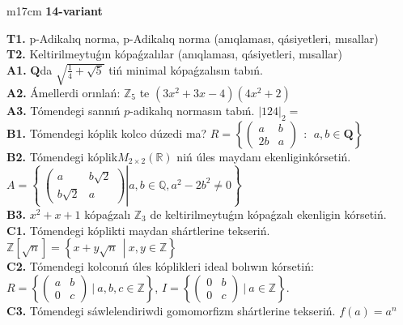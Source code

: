 \documentclass{article}
\begin{document}
\begin{tabular}{m{17cm}}
\textbf{14-variant}
\newline

\textbf{T1.} p-Adikalıq norma, p-Adikalıq norma (anıqlaması, qásiyetleri, mısallar) \\
\textbf{T2.} Keltirilmeytuǵın kópaǵzalılar (anıqlaması, qásiyetleri, mısallar) \\
\textbf{A1.} \(\mathbf{Q}\)da \(\sqrt{\frac{1}{4} + \sqrt{5}}\) tiń minimal kópaǵzalısın tabıń. \\
\textbf{A2.} Ámellerdi orınlań: \(\mathbb{Z}_{5}\) te \(\left( 3x^{2} + 3x - 4 \right)\left( 4x^{2} + 2 \right)\) \\
\textbf{A3.} Tómendegi sannıń \(p\)-adikalıq normasın tabıń. \(|124|_{2} =\) \\
\textbf{B1.} Tómendegi kóplik kolco dúzedi ma? \(R = \left\{ \begin{pmatrix}
a & b \\
2b & a
\end{pmatrix}\ \ :\ \ a,b \in \mathbf{Q} \right\}\) \\
\textbf{B2.} Tómendegi kóplik\(M_{2 \times 2}\left( \mathbb{R} \right)\) niń úles maydanı ekenliginkórsetiń. \(A = \left\{ \left. \ \begin{pmatrix}
a & b\sqrt{2} \\
b\sqrt{2} & a
\end{pmatrix} \right|a,b\mathbb{\in Q},a^{2} - 2b^{2} \neq 0 \right\}\) \\
\textbf{B3.} \(x^{2} + x + 1\) kópaǵzalı \(\mathbb{Z}_{3}\) de keltirilmeytuǵın kópaǵzalı ekenligin kórsetiń. \\
\textbf{C1.} Tómendegi kóplikti maydan shártlerine tekseriń. \(\mathbb{Z}\left\lbrack \sqrt{n} \right\rbrack = \left\{ x + y\sqrt{n}\ \ \left| \right.\ x,y \in \mathbb{Z} \right\}\) \\
\textbf{C2.} Tómendegi kolconıń úles kóplikleri ideal bolıwın kórsetiń:
\(R = \left\{ \begin{pmatrix}
a & b \\
0 & c
\end{pmatrix}\ |\ a,b,c \in \mathbb{Z} \right\}\), \(I = \left\{ \begin{pmatrix}
0 & b \\
0 & c
\end{pmatrix}\ |\ a \in \mathbb{Z} \right\}\). \\
\textbf{C3.} Tómendegi sáwlelendiriwdi gomomorfizm shártlerine tekseriń. \(f(a) = a^{n}\) \\

\end{tabular}
\vspace{1cm}
\end{document}
